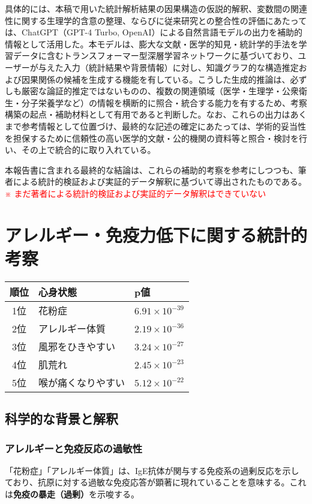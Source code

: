\documentclass[a4paper,12pt]{article}
\begin{document}
具体的には、本稿で用いた統計解析結果の因果構造の仮説的解釈、変数間の関連性に関する生理学的含意の整理、ならびに従来研究との整合性の評価にあたっては、ChatGPT（GPT-4 Turbo, OpenAI）による自然言語モデルの出力を補助的情報として活用した。本モデルは、膨大な文献・医学的知見・統計学的手法を学習データに含むトランスフォーマー型深層学習ネットワークに基づいており、ユーザーが与えた入力（統計結果や背景情報）に対し、知識グラフ的な構造推定および因果関係の候補を生成する機能を有している。こうした生成的推論は、必ずしも厳密な論証的推定ではないものの、複数の関連領域（医学・生理学・公衆衛生・分子栄養学など）の情報を横断的に照合・統合する能力を有するため、考察構築の起点・補助材料として有用であると判断した。なお、これらの出力はあくまで参考情報として位置づけ、最終的な記述の確定にあたっては、学術的妥当性を担保するために信頼性の高い医学的文献・公的機関の資料等と照合・検討を行い、その上で統合的に取り入れている。


本報告書に含まれる最終的な結論は、これらの補助的考察を参考にしつつも、筆者による統計的検証および実証的データ解釈に基づいて導出されたものである。\\
\textcolor{red}{※ まだ著者による統計的検証および実証的データ解釈はできていない}

\newpage

\section{アレルギー・免疫力低下に関する統計的考察}
\begin{table}[H]
\centering
\begin{tabular}{|c|l|l|}
\hline
順位 & 心身状態 & p値 \\
\hline
1位 & 花粉症 & $6.91 \times 10^{-39}$ \\
2位 & アレルギー体質 & $2.19 \times 10^{-36}$ \\
3位 & 風邪をひきやすい & $3.24 \times 10^{-27}$ \\
4位 & 肌荒れ & $2.45 \times 10^{-23}$ \\
5位 & 喉が痛くなりやすい & $5.12 \times 10^{-22}$ \\
\hline
\end{tabular}
\end{table}

\subsection*{科学的な背景と解釈}

\subsubsection*{アレルギーと免疫反応の過敏性}
「花粉症」「アレルギー体質」は、IgE抗体が関与する免疫系の過剰反応を示しており、抗原に対する過敏な免疫応答が顕著に現れていることを意味する。これは\textbf{免疫の暴走（過剰）}を示唆する。
\end{document}
